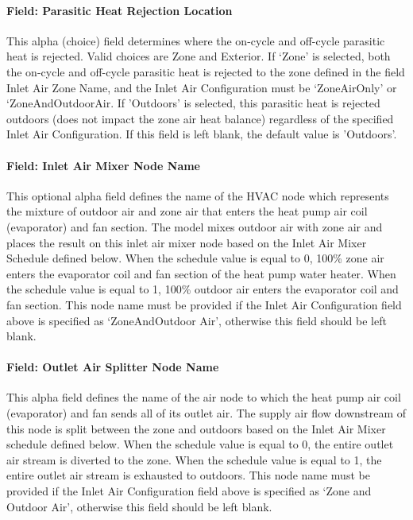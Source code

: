 \paragraph{Field: Parasitic Heat Rejection Location}\label{field-parasitic-heat-rejection-location-1}

This alpha (choice) field determines where the on-cycle and off-cycle parasitic heat is rejected. Valid choices are Zone and Exterior. If `Zone' is selected, both the on-cycle and off-cycle parasitic heat is rejected to the zone defined in the field Inlet Air Zone Name, and the Inlet Air Configuration must be `ZoneAirOnly' or `ZoneAndOutdoorAir. If 'Outdoors' is selected, this parasitic heat is rejected outdoors (does not impact the zone air heat balance) regardless of the specified Inlet Air Configuration. If this field is left blank, the default value is 'Outdoors'.

\paragraph{Field: Inlet Air Mixer Node Name}\label{field-inlet-air-mixer-node-name-1}

This optional alpha field defines the name of the HVAC node which represents the mixture of outdoor air and zone air that enters the heat pump air coil (evaporator) and fan section. The model mixes outdoor air with zone air and places the result on this inlet air mixer node based on the Inlet Air Mixer Schedule defined below. When the schedule value is equal to 0, 100\% zone air enters the evaporator coil and fan section of the heat pump water heater. When the schedule value is equal to 1, 100\% outdoor air enters the evaporator coil and fan section. This node name must be provided if the Inlet Air Configuration field above is specified as `ZoneAndOutdoor Air', otherwise this field should be left blank.

\paragraph{Field: Outlet Air Splitter Node Name}\label{field-outlet-air-splitter-node-name-1}

This alpha field defines the name of the air node to which the heat pump air coil (evaporator) and fan sends all of its outlet air. The supply air flow downstream of this node is split between the zone and outdoors based on the Inlet Air Mixer schedule defined below. When the schedule value is equal to 0, the entire outlet air stream is diverted to the zone. When the schedule value is equal to 1, the entire outlet air stream is exhausted to outdoors. This node name must be provided if the Inlet Air Configuration field above is specified as `Zone and Outdoor Air', otherwise this field should be left blank.

